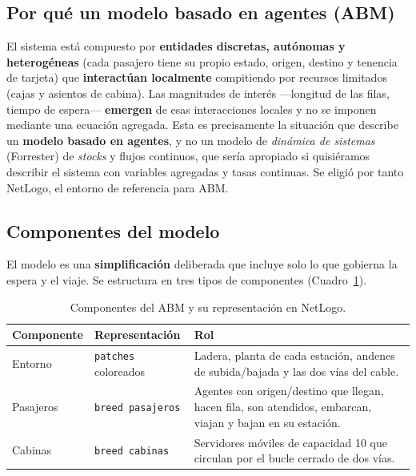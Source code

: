 \documentclass[11pt,a4paper]{article}
\newcommand{\code}[1]{\texttt{#1}}
\begin{document}
\subsection{Por qué un modelo basado en agentes (ABM)}
El sistema está compuesto por \textbf{entidades discretas, autónomas y
heterogéneas} (cada pasajero tiene su propio estado, origen, destino y tenencia de
tarjeta) que \textbf{interactúan localmente} compitiendo por recursos limitados
(cajas y asientos de cabina). Las magnitudes de interés ---longitud de las filas,
tiempo de espera--- \textbf{emergen} de esas interacciones locales y no se imponen
mediante una ecuación agregada. Esta es precisamente la situación que describe un
\textbf{modelo basado en agentes}, y no un modelo de \emph{dinámica de sistemas}
(Forrester) de \emph{stocks} y flujos continuos, que sería apropiado si quisiéramos
describir el sistema con variables agregadas y tasas continuas. Se eligió por tanto
NetLogo, el entorno de referencia para ABM.

\subsection{Componentes del modelo}
El modelo es una \textbf{simplificación} deliberada que incluye solo lo que gobierna
la espera y el viaje. Se estructura en tres tipos de componentes
(Cuadro~\ref{tab:componentes}).

\begin{table}[h]
\centering
\caption{Componentes del ABM y su representación en NetLogo.}
\label{tab:componentes}
\renewcommand{\arraystretch}{1.2}
\begin{tabular}{p{2.6cm} p{3.2cm} p{8.2cm}}
\toprule
Componente & Representación & Rol \\
\midrule
Entorno & \code{patches} coloreados & Ladera, planta de cada estación, andenes de
subida/bajada y las dos vías del cable. \\
Pasajeros & \code{breed pasajeros} & Agentes con origen/destino que llegan, hacen
fila, son atendidos, embarcan, viajan y bajan en su estación. \\
Cabinas & \code{breed cabinas} & Servidores móviles de capacidad 10 que circulan por
el bucle cerrado de dos vías. \\
\bottomrule
\end{tabular}
\end{table}
\end{document}
